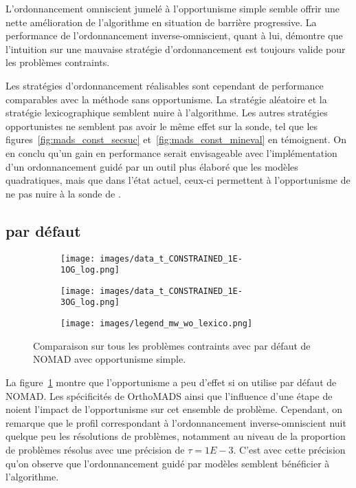 L'ordonnancement omniscient jumelé à l'opportunisme simple semble offrir une nette amélioration de l'algorithme \MADS en situation de barrière progressive. La performance de l'ordonnancement inverse-omniscient, quant à lui, démontre que l'intuition sur une mauvaise stratégie d'ordonnancement est toujours valide pour les problèmes contraints.

Les stratégies d'ordonnancement réalisables sont cependant de performance comparables avec la méthode sans opportunisme. La stratégie aléatoire et la stratégie lexicographique semblent nuire à l'algorithme. Les autres stratégies opportunistes ne semblent pas avoir le même effet sur la sonde, tel que les figures~\ref{fig:mads_const_secsuc} et~\ref{fig:mads_const_mineval} en témoignent. On en conclu qu'un gain en performance serait envisageable avec l'implémentation d'un ordonnancement guidé par un outil plus élaboré que les modèles quadratiques, mais que dans l'état actuel, ceux-ci permettent à l'opportunisme de ne pas nuire à la sonde de \MADS.
\subsection{\MADS par défaut}
\begin{figure}[!htb]
	\centering
	\begin{subfigure}{0.43\textwidth}
		\texttt{[image: images/data\_t\_CONSTRAINED\_1E-1OG\_log.png]}
	\end{subfigure}%
	\begin{subfigure}{0.43\textwidth}
		\texttt{[image: images/data\_t\_CONSTRAINED\_1E-3OG\_log.png]}
	\end{subfigure}
	\smallskip
	\begin{subfigure}{0.95\textwidth}
		\texttt{[image: images/legend\_mw\_wo\_lexico.png]}
	\end{subfigure}
	\caption{Comparaison sur tous les problèmes contraints avec \MADS par défaut de NOMAD avec opportunisme simple.}
	\label{fig:t_const_og}
\end{figure}
La figure~\ref{fig:t_const_og} montre que l'opportunisme a peu d'effet si on utilise \MADS par défaut de NOMAD. Les spécificités de \textsf{OrthoMADS} ainsi que l'influence d'une étape de \SEARCH noient l'impact de l'opportunisme sur cet ensemble de problème. Cependant, on remarque que le profil correspondant à l'ordonnancement inverse-omniscient nuit quelque peu les résolutions de problèmes, notamment au niveau de la proportion de problèmes résolus avec une précision de $\tau = 1E-3$. C'est avec cette précision qu'on observe que l'ordonnancement guidé par modèles semblent bénéficier à l'algorithme. 
